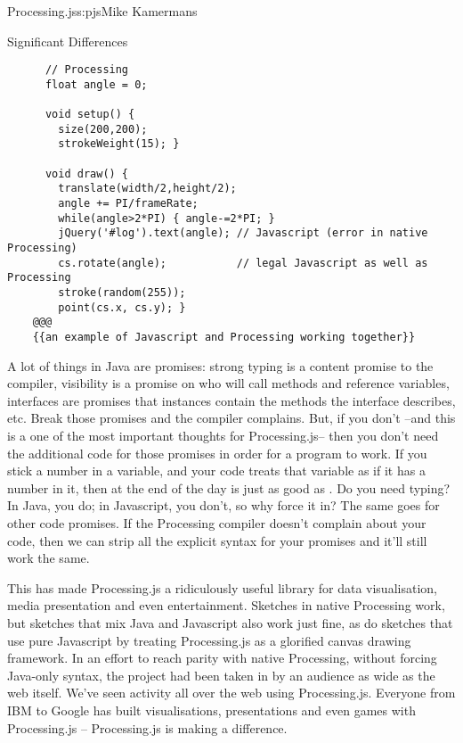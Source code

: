 \begin{aosachapter}{Processing.js}{s:pjs}{Mike Kamermans}
\begin{aosasect1}{Significant Differences}
\begin{verbatim}
      // Processing
      float angle = 0;

      void setup() {
        size(200,200);
        strokeWeight(15); }

      void draw() {
        translate(width/2,height/2);
        angle += PI/frameRate;
        while(angle>2*PI) { angle-=2*PI; }
        jQuery('#log').text(angle); // Javascript (error in native Processing)
        cs.rotate(angle);           // legal Javascript as well as Processing
        stroke(random(255));
        point(cs.x, cs.y); }
    @@@
    {{an example of Javascript and Processing working together}}
\end{verbatim}

A lot of things in Java are promises: strong typing is a content
promise to the compiler, visibility is a promise on who will call
methods and reference variables, interfaces are promises that
instances contain the methods the interface describes, etc. Break
those promises and the compiler complains. But, if you don't --and
this is a one of the most important thoughts for Processing.js-- then
you don't need the additional code for those promises in order for a
program to work. If you stick a number in a variable, and your code
treats that variable as if it has a number in it, then at the end of
the day  is just as good as . Do you need
typing? In Java, you do; in Javascript, you don't, so why force it in?
The same goes for other code promises. If the Processing compiler
doesn't complain about your code, then we can strip all the explicit
syntax for your promises and it'll still work the same.

This has made Processing.js a ridiculously useful library for data
visualisation, media presentation and even entertainment. Sketches in
native Processing work, but sketches that mix Java and Javascript also
work just fine, as do sketches that use pure Javascript by treating
Processing.js as a glorified canvas drawing framework. In an effort to
reach parity with native Processing, without forcing Java-only syntax,
the project had been taken in by an audience as wide as the web
itself. We've seen activity all over the web using
Processing.js. Everyone from IBM to Google has built visualisations,
presentations and even games with Processing.js -- Processing.js is
making a difference.


\end{aosasect1}
\end{aosachapter}
